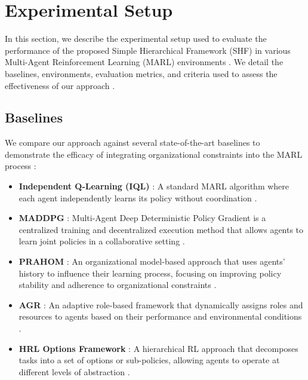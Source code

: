 \documentclass[sigconf,anonymous]{aamas}
\begin{document}
\section{Experimental Setup}
\label{sec:experimental_setup}

In this section, we describe the experimental setup used to evaluate the performance of the proposed Simple Hierarchical Framework (SHF) in various Multi-Agent Reinforcement Learning (MARL) environments \cite{hubner2010moise}. We detail the baselines, environments, evaluation metrics, and criteria used to assess the effectiveness of our approach \cite{foerster2018counterfactual, soule2024}.


\subsection{Baselines}
We compare our approach against several state-of-the-art baselines to demonstrate the efficacy of integrating organizational constraints into the MARL process \cite{foerster2018counterfactual}:

\begin{itemize}
    \item \textbf{Independent Q-Learning (IQL)} \cite{iql_reference}: A standard MARL algorithm where each agent independently learns its policy without coordination \cite{foerster2016learning}.
    \item \textbf{MADDPG} \cite{maddpg_reference}: Multi-Agent Deep Deterministic Policy Gradient is a centralized training and decentralized execution method that allows agents to learn joint policies in a collaborative setting \cite{lowe2017multi}.
    \item \textbf{PRAHOM} \cite{prahom_reference}: An organizational model-based approach that uses agents' history to influence their learning process, focusing on improving policy stability and adherence to organizational constraints \cite{hubner2010moise}.
    \item \textbf{AGR} \cite{agr_reference}: An adaptive role-based framework that dynamically assigns roles and resources to agents based on their performance and environmental conditions \cite{hernandez2019survey}.
    \item \textbf{HRL Options Framework} \cite{options_hrl_reference}: A hierarchical RL approach that decomposes tasks into a set of options or sub-policies, allowing agents to operate at different levels of abstraction \cite{foerster2018counterfactual}.
\end{itemize}
\end{document}
